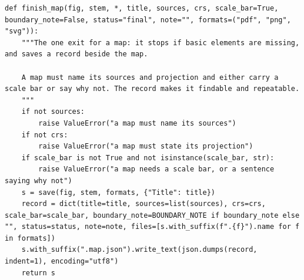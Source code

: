 \begin{lstlisting}[firstnumber=131]
def finish_map(fig, stem, *, title, sources, crs, scale_bar=True, boundary_note=False, status="final", note="", formats=("pdf", "png", "svg")):
    """The one exit for a map: it stops if basic elements are missing, and saves a record beside the map.

    A map must name its sources and projection and either carry a scale bar or say why not. The record makes it findable and repeatable.
    """
    if not sources:
        raise ValueError("a map must name its sources")
    if not crs:
        raise ValueError("a map must state its projection")
    if scale_bar is not True and not isinstance(scale_bar, str):
        raise ValueError("a map needs a scale bar, or a sentence saying why not")
    s = save(fig, stem, formats, {"Title": title})
    record = dict(title=title, sources=list(sources), crs=crs, scale_bar=scale_bar, boundary_note=BOUNDARY_NOTE if boundary_note else "", status=status, note=note, files=[s.with_suffix(f".{f}").name for f in formats])
    s.with_suffix(".map.json").write_text(json.dumps(record, indent=1), encoding="utf8")
    return s
\end{lstlisting}
